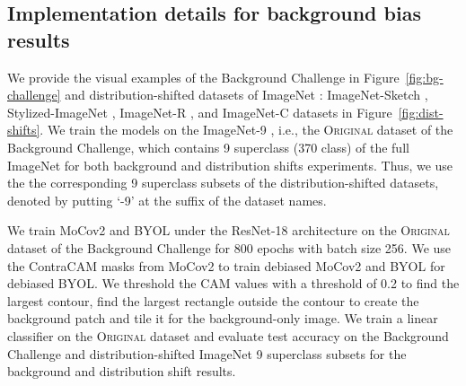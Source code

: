 \newpage
\subsection{Implementation details for background bias results}
\label{sec:details-bg}

We provide the visual examples of the Background Challenge \citep{xiao2021noise} in Figure~\ref{fig:bg-challenge} and distribution-shifted datasets of ImageNet \citep{deng2009imagenet}: ImageNet-Sketch \citep{wang2019learning}, Stylized-ImageNet \citep{geirhos2019imagenet}, ImageNet-R \citep{hendrycks2020many}, and ImageNet-C \citep{hendrycks2019robustness} datasets in Figure~\ref{fig:dist-shifts}. We train the models on the ImageNet-9 \citep{xiao2021noise}, i.e., the \textsc{Original} dataset of the Background Challenge, which contains 9 superclass (370 class) of the full ImageNet for both background and distribution shifts experiments. Thus, we use the the corresponding 9 superclass subsets of the distribution-shifted datasets, denoted by putting ‘-9’ at the suffix of the dataset names. 




We train MoCov2 and BYOL under the ResNet-18 architecture on the \textsc{Original} dataset of the Background Challenge for 800 epochs with batch size 256. We use the ContraCAM masks from MoCov2 to train debiased MoCov2 and BYOL for debiased BYOL. We threshold the CAM values with a threshold of 0.2 to find the largest contour, find the largest rectangle outside the contour to create the background patch and tile it for the background-only image. We train a linear classifier on the \textsc{Original} dataset and evaluate test accuracy on the Background Challenge and distribution-shifted ImageNet 9 superclass subsets for the background and distribution shift results.



